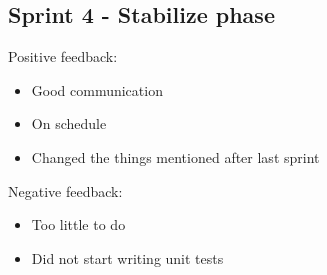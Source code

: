 \documentclass[a4paper,12pt]{article}
\begin{document}
 \subsection{Sprint 4 - Stabilize phase}
 Positive feedback:
 \begin{itemize}
 	\item Good communication
 	\item On schedule
 	\item Changed the things mentioned after last sprint
 \end{itemize}
 Negative feedback:
 \begin{itemize}
 	\item Too little to do
 	\item Did not start writing unit tests
 \end{itemize}
\end{document}
